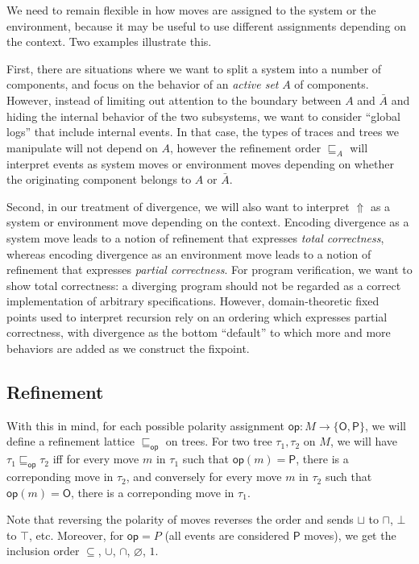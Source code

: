 \documentclass[11pt]{article}
\newcommand{\kw}[1]{{\mathsf{#1}}}
\begin{document}
We need to remain flexible in how
moves are assigned to the system or the environment,
because it may be useful to use different assignments
depending on the context.
Two examples illustrate this.

First, there are situations where
we want to split a system into a number of components,
and focus on the behavior of an \emph{active set} $A$ of components.
However, instead of limiting out attention to
the boundary between $A$ and $\bar{A}$
and hiding the internal behavior of the two subsystems,
we want to consider ``global logs'' that include internal events.
In that case,
the types of traces and trees we manipulate will not depend on $A$,
however the refinement order $\sqsubseteq_A$
will interpret events as system moves or environment moves
depending on whether the originating component belongs to $A$ or $\bar{A}$.

Second, in our treatment of divergence,
we will also want to interpret $\Uparrow$ as a system or environment move
depending on the context.
Encoding divergence as a system move
leads to a notion of refinement that expresses \emph{total correctness},
whereas
encoding divergence as an environment move
leads to a notion of refinement that expresses \emph{partial correctness}.
For program verification,
we want to show total correctness:
a diverging program should not be regarded as
a correct implementation of arbitrary specifications.
However,
domain-theoretic fixed points used to interpret recursion
rely on an ordering which expresses partial correctness,
with divergence as the bottom ``default''
to which more and more behaviors are added
as we construct the fixpoint.

\subsection{Refinement}

With this in mind,
for each possible polarity assignment
$\kw{op} : M \rightarrow \{\kw{O}, \kw{P}\}$,
we will define a refinement lattice $\sqsubseteq_\kw{op}$ on trees.
For two tree $\tau_1, \tau_2$ on $M$,
we will have $\tau_1 \sqsubseteq_\kw{op} \tau_2$ iff
for every move $m$ in $\tau_1$ such that $\kw{op}(m) = \kw{P}$,
there is a correponding move in $\tau_2$, and conversely
for every move $m$ in $\tau_2$ such that $\kw{op}(m) = \kw{O}$,
there is a correponding move in $\tau_1$.

Note that reversing the polarity of moves
reverses the order and sends
$\sqcup$ to $\sqcap$, $\bot$ to $\top$, etc.
Moreover, for $\kw{op} = P$ (all events are considered $\kw{P}$ moves),
we get the inclusion order $\subseteq$, $\cup$, $\cap$, $\varnothing$, $1$.
\end{document}
